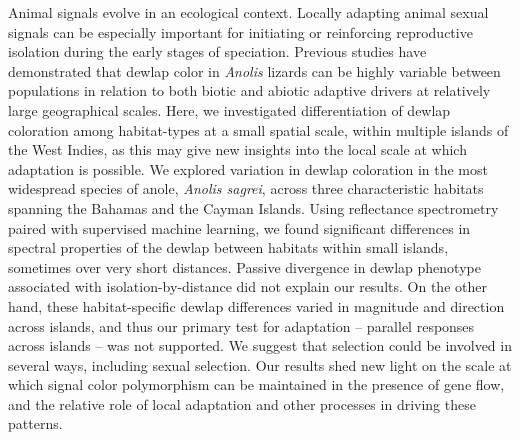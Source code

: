Animal signals evolve in an ecological context. Locally adapting animal sexual signals can be especially important for initiating or reinforcing reproductive isolation during the early stages of speciation. Previous studies have demonstrated that dewlap color in \textit{Anolis} lizards can be highly variable between populations in relation to both biotic and abiotic adaptive drivers at relatively large geographical scales. Here, we investigated differentiation of dewlap coloration among habitat-types at a small spatial scale, within multiple islands of the West Indies, as this may give new insights into the local scale at which adaptation is possible. We explored variation in dewlap coloration in the most widespread species of anole, \textit{Anolis sagrei}, across three characteristic habitats spanning the Bahamas and the Cayman Islands. Using reflectance spectrometry paired with supervised machine learning, we found significant differences in spectral properties of the dewlap between habitats within small islands, sometimes over very short distances. Passive divergence in dewlap phenotype associated with isolation-by-distance did not explain our results. On the other hand, these habitat-specific dewlap differences varied in magnitude and direction across islands, and thus our primary test for adaptation -- parallel responses across islands -- was not supported. We suggest that selection could be involved in several ways, including sexual selection. Our results shed new light on the scale at which signal color polymorphism can be maintained in the presence of gene flow, and the relative role of local adaptation and other processes in driving these patterns.

